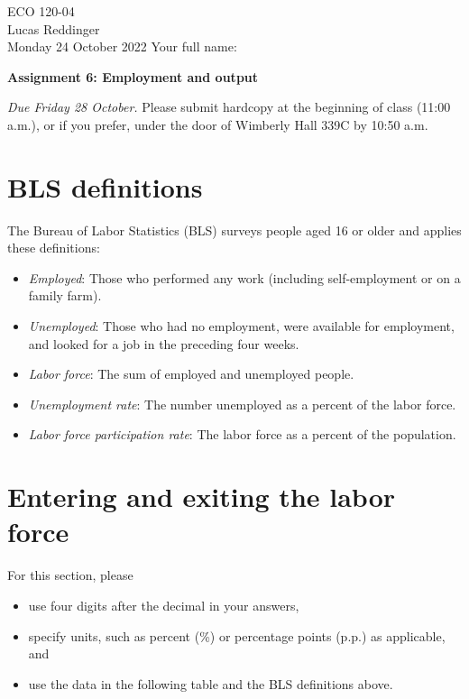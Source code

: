 \documentclass[
    letterpaper,paper=portrait,fleqn,
    DIV=16,fontsize=12pt,twoside=semi,
    parskip=full-,
    headings=standardclasses]
{scrartcl}
\begin{document}
\RaggedRight
\thispagestyle{plain}

ECO 120-04 \\
Lucas Reddinger \\
Monday 24 October 2022 \hfill Your full name: \underline{\hspace{3.25in}}

\vspace{0.7\baselineskip}
\textbf{\LARGE Assignment 6: Employment and output}
\vspace{0.3\baselineskip}

\emph{Due Friday 28 October.} Please submit hardcopy at the beginning of class (11:00 a.m.), or if you prefer, under the door of Wimberly Hall 339C by 10:50 a.m.

\section{BLS definitions\label{sec:bls-definitions}}

The Bureau of Labor Statistics (BLS) surveys people aged 16 or older and applies these definitions:
\begin{itemize}[nosep]
\item \emph{Employed}: Those who performed any work (including self-employment or on a family farm).
\item \emph{Unemployed}: Those who had no employment, were available for employment, and looked for a job in the preceding four weeks.
\item \emph{Labor force}: The sum of employed and unemployed people.
\item \emph{Unemployment rate}: The number unemployed as a percent of the labor force.
\item \emph{Labor force participation rate}: The labor force as a percent of the population.
\end{itemize}

\section{Entering and exiting the labor force}

For this section, please
\begin{itemize}[nosep]
\item use four digits after the decimal in your answers,
\item specify units, such as percent (\%) or percentage points (p.p.) as applicable, and
\item use the data in the following table and the BLS definitions above.
\end{itemize}
\end{document}

